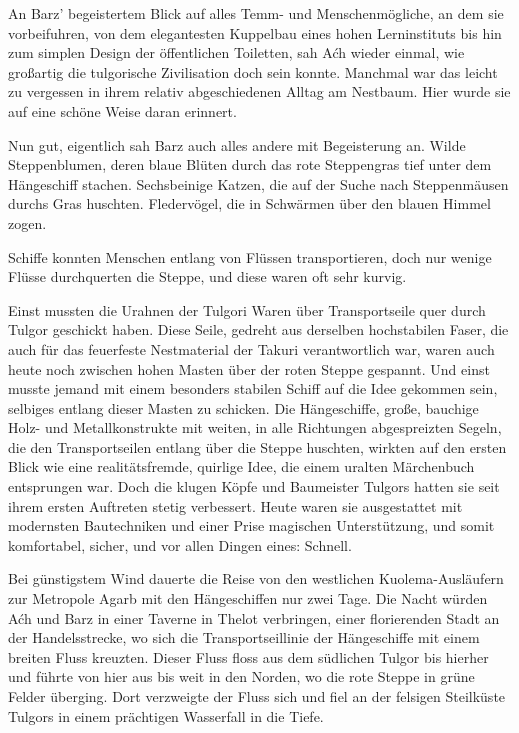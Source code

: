 An Barz’ begeistertem Blick auf alles Temm- und Menschenmögliche, an dem sie vorbeifuhren, von dem elegantesten Kuppelbau eines hohen Lerninstituts bis hin zum simplen Design der öffentlichen Toiletten, sah Aćh wieder einmal, wie großartig die tulgorische Zivilisation doch sein konnte. Manchmal war das leicht zu vergessen in ihrem relativ abgeschiedenen Alltag am Nestbaum. Hier wurde sie auf eine schöne Weise daran erinnert.

Nun gut, eigentlich sah Barz auch alles andere mit Begeisterung an. Wilde Steppenblumen, deren blaue Blüten durch das rote Steppengras tief unter dem Hängeschiff stachen. Sechsbeinige Katzen, die auf der Suche nach Steppenmäusen durchs Gras huschten. Fledervögel, die in Schwärmen über den blauen Himmel zogen.

Schiffe konnten Menschen entlang von Flüssen transportieren, doch nur wenige Flüsse durchquerten die Steppe, und diese waren oft sehr kurvig.

Einst mussten die Urahnen der Tulgori Waren über Transportseile quer durch Tulgor geschickt haben. Diese Seile, gedreht aus derselben hochstabilen Faser, die auch für das feuerfeste Nestmaterial der Takuri verantwortlich war, waren auch heute noch zwischen hohen Masten über der roten Steppe gespannt. Und einst musste jemand mit einem besonders stabilen Schiff auf die Idee gekommen sein, selbiges entlang dieser Masten zu schicken. Die Hängeschiffe, große, bauchige Holz- und Metallkonstrukte mit weiten, in alle Richtungen abgespreizten Segeln, die den Transportseilen entlang über die Steppe huschten, wirkten auf den ersten Blick wie eine realitätsfremde, quirlige Idee, die einem uralten Märchenbuch entsprungen war. Doch die klugen Köpfe und Baumeister Tulgors hatten sie seit ihrem ersten Auftreten stetig verbessert. Heute waren sie ausgestattet mit modernsten Bautechniken und einer Prise magischen Unterstützung, und somit komfortabel, sicher, und vor allen Dingen eines: Schnell.

Bei günstigstem Wind dauerte die Reise von den westlichen Kuolema-Ausläufern zur Metropole Agarb mit den Hängeschiffen nur zwei Tage. Die Nacht würden Aćh und Barz in einer Taverne in Thelot verbringen, einer florierenden Stadt an der Handelsstrecke, wo sich die Transportseillinie der Hängeschiffe mit einem breiten Fluss kreuzten. Dieser Fluss floss aus dem südlichen Tulgor bis hierher und führte von hier aus bis weit in den Norden, wo die rote Steppe in grüne Felder überging. Dort verzweigte der Fluss sich und fiel an der felsigen Steilküste Tulgors in einem prächtigen Wasserfall in die Tiefe.

